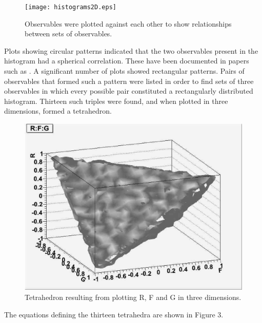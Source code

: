 \documentclass[a4paper,12pt]{article}
\begin{document}
\begin{figure}[!ht]
 \begin{center}
  \texttt{[image: histograms2D.eps]}
  \caption{Observables were plotted against each other to show relationships between sets of observables.}
 \end{center}
\end{figure}

Plots showing circular patterns indicated that the two observables present in the histogram had a spherical correlation.  These have been documented in papers such as \cite{info}. A significant number of plots showed rectangular patterns.  Pairs of observables that formed such a pattern were listed in order to find sets of three observables in which every possible pair constituted a rectangularly distributed histogram.  Thirteen such triples were found, and when plotted in three dimensions, formed a tetrahedron.

\begin{figure}[!h]
 \begin{center}
  \includegraphics[scale=0.25]{RFG.eps}
  \caption{Tetrahedron resulting from plotting R, F and G in three dimensions.}
 \end{center}
\end{figure}

The equations defining the thirteen tetrahedra are shown in Figure 3.
\end{document}

